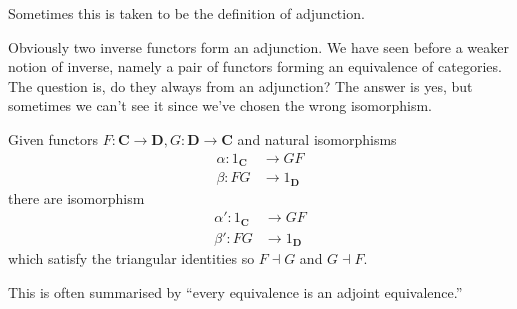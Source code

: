 \documentclass[a4paper]{article}
\renewcommand{\c}[1]{\mathbf{#1}}
\newcommand{\adjoint}{\dashv}
\begin{document}
Sometimes this is taken to be the definition of adjunction.

Obviously two inverse functors form an adjunction. We have seen before a weaker notion of inverse, namely a pair of functors forming an equivalence of categories. The question is, do they always from an adjunction? The answer is yes, but sometimes we can't see it since we've chosen the wrong isomorphism.

\begin{lemma}
  Given functors \(F: \c C \to \c D, G: \c D \to \c C\) and natural isomorphisms
  \begin{align*}
    \alpha: 1_{\c C} &\to GF \\
    \beta: FG &\to 1_{\c D}
  \end{align*}
  there are isomorphism
  \begin{align*}
    \alpha': 1_{\c C} &\to GF \\
    \beta': FG &\to 1_{\c D}
  \end{align*}
  which satisfy the triangular identities so \(F \adjoint G\) and \(G \adjoint F\).
\end{lemma}

This is often summarised by ``every equivalence is an adjoint equivalence.''
\end{document}
